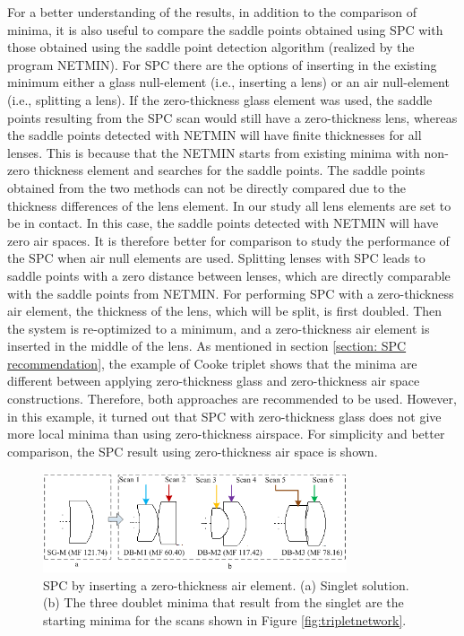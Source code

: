For a better understanding of the results, in addition to the comparison of minima, it is also useful to compare the saddle points obtained using SPC with those obtained using the saddle point detection algorithm (realized by the program NETMIN). For SPC there are the options of inserting in the existing minimum either a glass null-element (i.e., inserting a lens) or an air null-element (i.e., splitting a lens). If the zero-thickness glass element was used, the saddle points resulting from the SPC scan would still have a zero-thickness lens, whereas the saddle points detected with NETMIN will have finite thicknesses for all lenses. This is because that the NETMIN starts from existing minima with non-zero thickness element and searches for the saddle points. The saddle points obtained from the two methods can not be directly compared due to the thickness differences of the lens element. In our study all lens elements are set to be in contact. In this case, the saddle points detected with NETMIN will have zero air spaces. It is therefore better for comparison to study the performance of the SPC when air null elements are used. Splitting lenses with SPC leads to saddle points with a zero distance between lenses, which are directly comparable with the saddle points from NETMIN. For performing SPC with a zero-thickness air element, the thickness of the lens, which will be split, is first doubled. Then the system is re-optimized to a minimum, and a zero-thickness air element is inserted in the middle of the lens. As mentioned in section \ref{section: SPC recommendation}, the example of Cooke triplet shows that the minima are different between applying zero-thickness glass and zero-thickness air space constructions. Therefore, both approaches are recommended to be used. However, in this example, it turned out that SPC with zero-thickness glass does not give more local minima than using zero-thickness airspace. For simplicity and better comparison, the SPC result using zero-thickness air space is shown. 
\begin{figure}[h!]
    \centering
    \includegraphics[width=0.8\textwidth]{chapter-3/figures/Single2Double.png}
    \caption{SPC by inserting a zero-thickness air element. (a) Singlet solution. (b) The three doublet minima that result from the singlet are the starting minima for the scans shown in Figure \ref{fig:tripletnetwork}.}
    \label{fig:single2double}
\end{figure}
